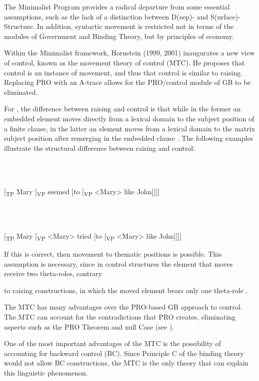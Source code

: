 \documentclass[output=paper]{langsci/langscibook}
\begin{document}
  The Minimalist Program provides a radical departure from some essential assumptions, such as the lack of a distinction between D(eep)- and S(urface)-Structure. In addition, syntactic movement is restricted not in terms of the modules of Government and Binding Theory, but by principles of economy. 

  Within the Minimalist framework, Hornstein (1999, 2001) inaugurates a new view of control, known as the movement theory of control (MTC). He proposes that control is an instance of movement, and thus that control is similar to raising. Replacing PRO with an A-trace allows for the PRO/control module of GB to be eliminated.

  For \citet{Hornstein1999}, the difference between raising and control is that while in the former an embedded element moves directly from a lexical domain to the subject position of a finite clause, in the latter an element moves from a lexical domain to the matrix subject position after remerging in the embedded clause \citep{Boeckx2006}. The following examples illustrate the structural difference between raising and control:

\ea%
    \label{ex:key:3}
    \gll\\
        \\
    \glt
    \z

            [\textsubscript{TP} Mary [\textsubscript{VP} seemed [to [\textsubscript{VP} <Mary> like John]]]]

\ea%
    \label{ex:key:4}
    \gll\\
        \\
    \glt
    \z

            [\textsubscript{TP} Mary [\textsubscript{VP} <Mary> tried [to [\textsubscript{VP} <Mary> like John]]]]

If this is correct, then movement to thematic positions is possible. This assumption is necessary, since in control structures the element that moves receive two theta-roles, contrary

to raising constructions, in which the moved element bears only one theta-role \citep{Hornstein1999}.

  The MTC has many advantages over the PRO-based GB approach to control. The MTC can account for the contradictions that PRO creates, eliminating aspects such as the PRO Theorem and null Case (see \citealt{Hornstein2001}). 

  One of the most important advantages of the MTC is the possibility of accounting for backward control (BC). Since Principle C of the binding theory would not allow BC constructions, the MTC is the only theory that can explain this linguistic phenomenon. 
\end{document}
